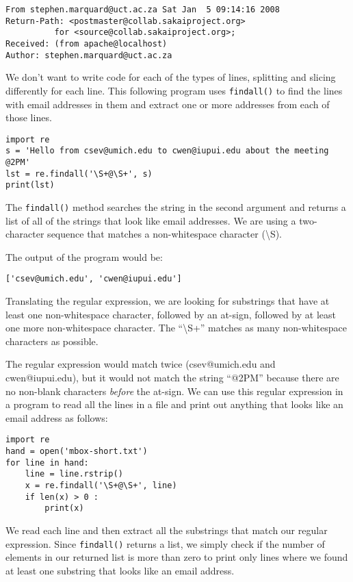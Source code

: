 \beforeverb
\begin{verbatim}
From stephen.marquard@uct.ac.za Sat Jan  5 09:14:16 2008
Return-Path: <postmaster@collab.sakaiproject.org>
          for <source@collab.sakaiproject.org>;
Received: (from apache@localhost)
Author: stephen.marquard@uct.ac.za
\end{verbatim}
\afterverb
%
We don't want to write code for each of the types of lines, splitting and slicing differently for each
line.  This following program uses {\tt findall()} to find the lines with email addresses in them and
extract one or more addresses from each of those lines.

\beforeverb
\begin{verbatim}
import re
s = 'Hello from csev@umich.edu to cwen@iupui.edu about the meeting @2PM'
lst = re.findall('\S+@\S+', s)
print(lst)
\end{verbatim}
\afterverb
%
The {\tt findall()} method searches the string in the second argument and returns a list of
all of the strings that look like email addresses.   We are using a two-character sequence 
that matches a non-whitespace character ({\textbackslash}S). 

The output of the program would be:

\beforeverb
\begin{verbatim}
['csev@umich.edu', 'cwen@iupui.edu']
\end{verbatim}
\afterverb
%
Translating the regular expression, we are looking for substrings that have at least one
non-whitespace character, followed by an at-sign, followed by at least one more non-whitespace
character.  The ``{\textbackslash}S+'' matches as many non-whitespace characters as possible.

The regular expression would match twice (csev@umich.edu and cwen@iupui.edu), but it would not
match the string ``@2PM'' because there are no non-blank characters {\em before} the at-sign.  
We can use this regular expression in a program to read all the lines in a file and print out
anything that looks like an email address as follows:

\beforeverb
\begin{verbatim}
import re
hand = open('mbox-short.txt')
for line in hand:
    line = line.rstrip()
    x = re.findall('\S+@\S+', line)
    if len(x) > 0 :
        print(x)
\end{verbatim}
\afterverb
%
We read each line and then extract all the substrings that match our regular expression.
Since {\tt findall()} returns a list, we simply check if the number of elements in our returned
list is more than zero to print only lines where we found at least one substring that looks
like an email address.


